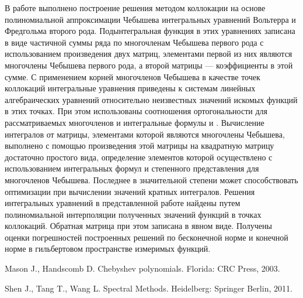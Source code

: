   В работе выполнено построение решения методом коллокации на основе полиномиальной аппроксимации Чебышева интегральных уравнений Вольтерра и Фредгольма второго рода. Подынтегральная функция в этих уравнениях записана в виде частичной суммы ряда по многочленам Чебышева первого рода с использованием произведения двух матриц, элементами первой из них являются многочлены Чебышева первого рода, а второй матрицы --- коэффициенты в этой сумме. С применением корней многочленов Чебышева в качестве точек коллокаций интегральные уравнения  приведены к системам линейных алгебраических уравнений относительно неизвестных значений искомых функций в этих точках. При этом использованы соотношения ортогональности для рассматриваемых многочленов и интегральные формулы \cite{bGermider1} и \cite{bGermider2}. Вычисление интегралов от матрицы, элементами которой являются многочлены Чебышева, выполнено с помощью произведения этой матрицы на квадратную матрицу достаточно простого вида, определение элементов которой осуществлено с использованием интегральных формул и степенного представления для многочленов Чебышева. Последнее в значительной степени может способствовать оптимизации при вычислении значений кратных интегралов. Решения интегральных уравнений в представленной работе найдены путем полиномиальной интерполяции полученных значений функций в точках коллокаций. Обратная матрица при этом записана в явном виде. Получены оценки погрешностей построенных решений по бесконечной норме и конечной норме в гильбертовом пространстве измеримых функций.


\begin{thebibliography}{9} %
 Mason J., Handscomb  D. Chebyshev polynomials. Florida: CRC Press, 2003.

 Shen J., Tang T., Wang  L. Spectral Methods. Heidelberg: Springer Berlin, 2011.

\end{thebibliography}





%

